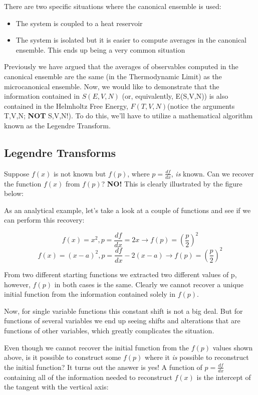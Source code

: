 \documentclass{article}
\newcommand{\dif}[2]{\frac{d#1}{d#2}}
\begin{document}

There are two specific situations where the canonical ensemble is used:

\begin{itemize}
	\item The system is coupled to a heat reservoir
	\item The system is isolated but it is easier to compute averages in the canonical ensemble.  This ends up being a very common situation
\end{itemize}

Previously we have argued that the averages of observables computed in the canonical ensemble are the same (in the Thermodynamic Limit) as the microcanonical ensemble.  Now, we would like to demonstrate that the information contained in $S(E,V,N)$ (or, equivalently, E(S,V,N)) is also contained in the Helmholtz Free Energy, $F(T,V,N)$(notice the arguments T,V,N; \textbf{NOT} S,V,N!).  To do this, we'll have to utilize a mathematical algorithm known as the Legendre Transform.

\subsection{Legendre Transforms}

Suppose $f(x)$ is not known but $f(p)$, where $p=\dif{f}{x}$, \textit{is} known.  Can we recover the function $f(x)$ from $f(p)$?  \textbf{NO!}  This is clearly illustrated by the figure below:


As an analytical example, let's take a look at a couple of functions and see if we can perform this recovery:

$$f(x)=x^{2}, p=\dif{f}{x}=2x \rightarrow f(p)=(\frac{p}{2})^{2}$$
$$f(x)=(x-a)^{2}, p=\dif{f}{x}-2(x-a) \rightarrow f(p)=(\frac{p}{2})^{2}$$

From two different starting functions we extracted two different values of p, however, $f(p)$ in both cases is the same.  Clearly we cannot recover a unique initial function from the information contained solely in $f(p)$.  

Now, for single variable functions this constant shift is not a big deal.  But for functions of several variables we end up seeing shifts and alterations that are functions of other variables, which greatly complicates the situation.  

Even though we cannot recover the initial function from the $f(p)$ values shown above, is it possible to construct some $f(p)$ where it \textit{is} possible to reconstruct the initial function?  It turns out the answer is yes!  A function of $p=\dif{f}{x}$ containing all of the information needed to reconstruct $f(x)$ is the intercept of the tangent with the vertical axis:
\end{document}
